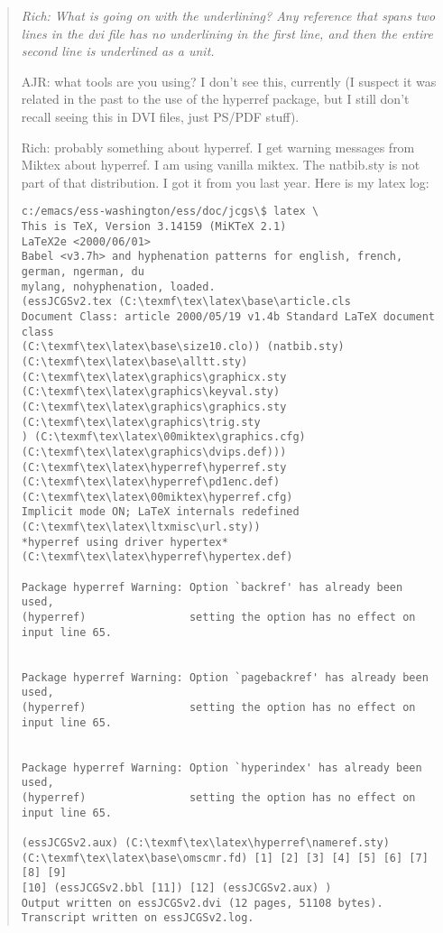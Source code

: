 \documentclass{article}
\def\url#1{\textsf{#1}} %
\newenvironment{Comment}{\begin{quote}\small\itshape }{\end{quote}}
\begin{document}
\begin{Comment}
  Rich: What is going on with the underlining?  Any reference that spans
two lines in the dvi file has no underlining in the first line, and then the
entire second line is underlined as a unit.

AJR: what tools are you using?  I don't see this, currently (I suspect
it was related in the past to the use of the hyperref package, but I
still don't recall seeing this in DVI files, just PS/PDF stuff).

Rich: probably something about hyperref.  I get warning messages from
Miktex about hyperref.  I am using vanilla miktex.  The natbib.sty is
not part of that distribution.  I got it from you last year.  Here is
my latex log:

\begin{verbatim}
c:/emacs/ess-washington/ess/doc/jcgs\$ latex \
This is TeX, Version 3.14159 (MiKTeX 2.1)
LaTeX2e <2000/06/01>
Babel <v3.7h> and hyphenation patterns for english, french, german, ngerman, du
mylang, nohyphenation, loaded.
(essJCGSv2.tex (C:\texmf\tex\latex\base\article.cls
Document Class: article 2000/05/19 v1.4b Standard LaTeX document class
(C:\texmf\tex\latex\base\size10.clo)) (natbib.sty)
(C:\texmf\tex\latex\base\alltt.sty) (C:\texmf\tex\latex\graphics\graphicx.sty
(C:\texmf\tex\latex\graphics\keyval.sty)
(C:\texmf\tex\latex\graphics\graphics.sty (C:\texmf\tex\latex\graphics\trig.sty
) (C:\texmf\tex\latex\00miktex\graphics.cfg)
(C:\texmf\tex\latex\graphics\dvips.def)))
(C:\texmf\tex\latex\hyperref\hyperref.sty
(C:\texmf\tex\latex\hyperref\pd1enc.def)
(C:\texmf\tex\latex\00miktex\hyperref.cfg)
Implicit mode ON; LaTeX internals redefined
(C:\texmf\tex\latex\ltxmisc\url.sty))
*hyperref using driver hypertex*
(C:\texmf\tex\latex\hyperref\hypertex.def)

Package hyperref Warning: Option `backref' has already been used,
(hyperref)                setting the option has no effect on input line 65.


Package hyperref Warning: Option `pagebackref' has already been used,
(hyperref)                setting the option has no effect on input line 65.


Package hyperref Warning: Option `hyperindex' has already been used,
(hyperref)                setting the option has no effect on input line 65.

(essJCGSv2.aux) (C:\texmf\tex\latex\hyperref\nameref.sty)
(C:\texmf\tex\latex\base\omscmr.fd) [1] [2] [3] [4] [5] [6] [7] [8] [9]
[10] (essJCGSv2.bbl [11]) [12] (essJCGSv2.aux) )
Output written on essJCGSv2.dvi (12 pages, 51108 bytes).
Transcript written on essJCGSv2.log.
\end{verbatim}

\end{Comment}
\end{document}
